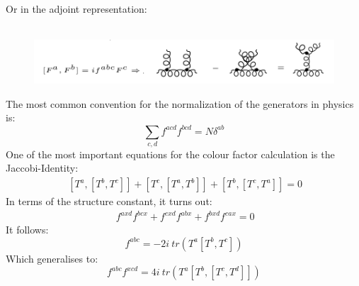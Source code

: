 Or in the adjoint representation:\\
\\
\begin{figure}[h!]
\centering
\includegraphics[scale=0.6]{images/Intro/CasimirAdj.png}
\end{figure}

The most common convention for the normalization of the generators in physics is:
\begin{equation}
\displaystyle\sum\limits_{c,d} f^{acd} f^{bcd} = N \delta^{ab}
\end{equation}
One of the most important equations for the colour factor calculation is the Jaccobi-Identity:
\begin{equation}
\begin{split}\:
[T^a, [T^b , T^c]]+[T^c, [T^a , T^b]]+[T^b, [T^c , T^a]]=0
\end{split}
\end{equation}
In terms of the structure constant, it turns out:
\begin{equation}
\begin{split}\:
f^{axd} f^{bcx} +  f^{cxd} f^{abx} +f^{bxd} f^{cax} =0
\end{split}
\end{equation}
It follows:
\begin{equation}
f^{abc} = -2i\: tr(T^a[T^b, T^c])
\end{equation}
Which generalises to:
\begin{equation}
f^{abc}f^{xcd} = 4i\: tr(T^a[T^b, [T^c, T^d]])
\end{equation}

